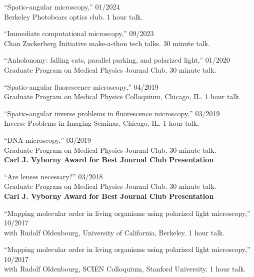 \documentclass[12pt,letterpaper]{article}
\begin{document}
\begin{benumerate}{11}
\item {``Spatio-angular microscopy,'' \hfill 01/2024\\Berkeley Photobears optics club. 1 hour talk.}

\item {``Immediate computational microscopy,'' \hfill 09/2023\\Chan Zuckerberg Initiative make-a-thon tech talks. 30 minute talk.}

\item {``Anholonomy: falling cats, parallel parking, and polarized light,'' \hfill 01/2020\\Graduate Program on Medical Physics Journal Club. 30 minute talk.}

\item {``Spatio-angular fluorescence microscopy,'' \hfill 04/2019\\
     Graduate Program on Medical Physics Colloquium, Chicago, IL. 1 hour talk.}

\item {``Spatio-angular inverse problems in fluorescence microscopy,'' \hfill 03/2019\\
     Inverse Problems in Imaging Seminar, Chicago, IL. 1 hour talk.}

\item {``DNA microscopy,'' \hfill 03/2019\\
    Graduate Program on Medical Physics Journal Club. 30 minute talk.\\
    \textbf{Carl J. Vyborny Award for Best Journal Club Presentation}}

\item {``Are lenses necessary?'' \hfill 03/2018\\
    Graduate Program on Medical Physics Journal Club. 30 minute talk.\\
    \textbf{Carl J. Vyborny Award for Best Journal Club Presentation}}
  
\item {``Mapping molecular order in living organisms using polarized light microscopy,'' \hfill 10/2017\\
    with Rudolf Oldenbourg, University of California, Berkeley. 1 hour talk.}
  
\item {``Mapping molecular order in living organisms using polarized light microscopy,'' \hfill 10/2017\\
    with Rudolf Oldenbourg, SCIEN Colloquium, Stanford University. 1 hour talk.}
  

\end{benumerate}
\end{document}
